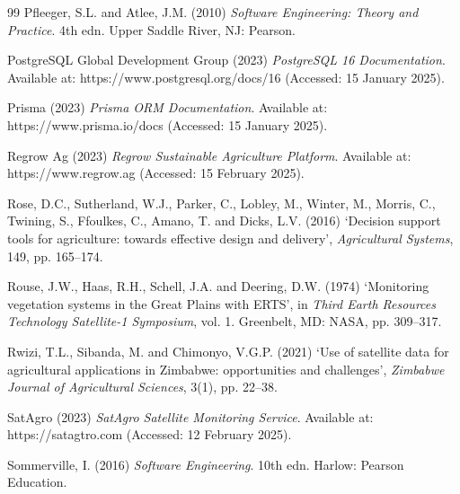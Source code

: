 \documentclass[12pt,a4paper]{report}
\begin{document}
\begin{thebibliography}{99}
Pfleeger, S.L. and Atlee, J.M. (2010) \textit{Software Engineering: Theory and Practice}. 4th edn. Upper Saddle River, NJ: Pearson.

PostgreSQL Global Development Group (2023) \textit{PostgreSQL 16 Documentation}. Available at: https://www.postgresql.org/docs/16 (Accessed: 15 January 2025).

Prisma (2023) \textit{Prisma ORM Documentation}. Available at: https://www.prisma.io/docs (Accessed: 15 January 2025).

Regrow Ag (2023) \textit{Regrow Sustainable Agriculture Platform}. Available at: https://www.regrow.ag (Accessed: 15 February 2025).

Rose, D.C., Sutherland, W.J., Parker, C., Lobley, M., Winter, M., Morris, C., Twining, S., Ffoulkes, C., Amano, T. and Dicks, L.V. (2016) `Decision support tools for agriculture: towards effective design and delivery', \textit{Agricultural Systems}, 149, pp. 165--174.

Rouse, J.W., Haas, R.H., Schell, J.A. and Deering, D.W. (1974) `Monitoring vegetation systems in the Great Plains with ERTS', in \textit{Third Earth Resources Technology Satellite-1 Symposium}, vol. 1. Greenbelt, MD: NASA, pp. 309--317.

Rwizi, T.L., Sibanda, M. and Chimonyo, V.G.P. (2021) `Use of satellite data for agricultural applications in Zimbabwe: opportunities and challenges', \textit{Zimbabwe Journal of Agricultural Sciences}, 3(1), pp. 22--38.

SatAgro (2023) \textit{SatAgro Satellite Monitoring Service}. Available at: https://satagtro.com (Accessed: 12 February 2025).

Sommerville, I. (2016) \textit{Software Engineering}. 10th edn. Harlow: Pearson Education.


\end{thebibliography}
\end{document}
